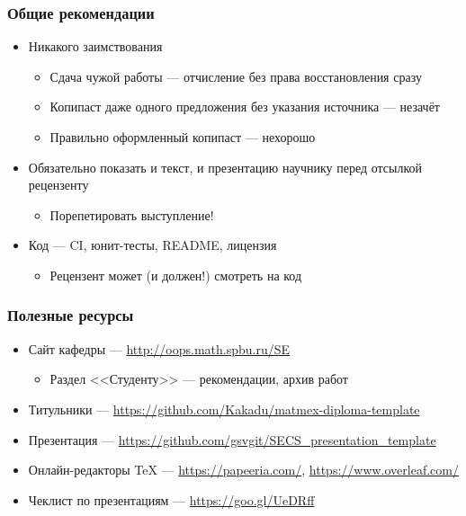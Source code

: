 \documentclass[xetex,mathserif,serif]{beamer}
\begin{document}
    \begin{frame}
        \frametitle{Общие рекомендации}
        \begin{itemize}
            \item Никакого заимствования 
            \begin{itemize}
                \item Сдача чужой работы --- отчисление без права восстановления сразу
                \item Копипаст даже одного предложения без указания источника --- незачёт
                \item Правильно оформленный копипаст --- нехорошо
            \end{itemize}
            \item Обязательно показать и текст, и презентацию научнику перед отсылкой рецензенту
            \begin{itemize}
                \item Порепетировать выступление!
            \end{itemize}
            \item Код --- CI, юнит-тесты, README, лицензия
            \begin{itemize}
                \item Рецензент может (и должен!) смотреть на код
            \end{itemize}
        \end{itemize}
    \end{frame}

    \begin{frame}
        \frametitle{Полезные ресурсы}
        \begin{itemize}
            \item Сайт кафедры --- \url{http://oops.math.spbu.ru/SE}
            \begin{itemize}
                \item Раздел <<Студенту>> --- рекомендации, архив работ
            \end{itemize}
            \item Титульники --- \url{https://github.com/Kakadu/matmex-diploma-template}
            \item Презентация --- \url{https://github.com/gsvgit/SECS_presentation_template}
            \item Онлайн-редакторы TeX --- \url{https://papeeria.com/}, \url{https://www.overleaf.com/}
            \item Чеклист по презентациям --- \url{https://goo.gl/UeDRff}
        \end{itemize}
    \end{frame}
\end{document}

